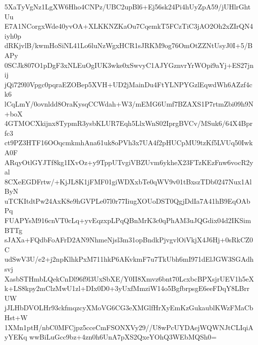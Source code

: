5XaTyVgNz1LgXW6Hho4CNPz/UBC2upBl6+Ej56sk24Pi4hUyZpA59/jUHlrGhtUu
E7A1NCorgxWde40yvOA+XLKKNZKaOu7CqemkT5FCzTiC3jAO2Oh2xZIrQN4iyh0p
dRKjvlB/kwmHoSiNL41Lo6luNzWgxHCR1sJRKM9og76OmOtZZNtUsyJ0I+5/BAPy
0SCJk807O1pDgF3xNLEuOgIUK3wke0xSwvyC1AJYGznvrYrWOpi9aYj+ES27jnij
jQi729l0Vpgc0pqraEZOBep5XVH+UD2jMainDu4FtYLNPYGzlEqwdWh6AZzf4ck6
lCqLmY/0ovnldd8OraKysqCCWdah+W3/mEMG6Umf7BZAXS1P7rtmZbi09h9N+boX
4GTMOCXkijnx8TypmR3ysbKLUR7Eqh5LlxWnS02IprgBVCv/MSuk6/64X4Bprfc3
ct9PZ3HTF16OOqcmkmhAna61uk8oPVh3x7UA4f2pHUCpMU9tzKf5LVUq50IwkA0F
ARqyOtlGYJTf8kg1IXvOz+y9TppUTvgiVBZUvm6ykheX23FTzKEzFnw6vocR2yal
8CXeEGDFrtw/+KjJL8K1jFMF01giWDXxbTe0qWV9v01tBxszTDb0247Nux1AlByN
uTCKItdtPw24AxK8e9hGVPLe07l0r77IiugXOUoDST0QgjDdIa7A41hB9EqOAbPq
FUAPYsM916cnVT0cLq+yvEqzxpLPqQBnMrK3c0qPhAM3uJQGdix04d2IKSimBTTg
sJAXa+FQdbFoAFrD2AN9NhmeNjsl3m31opBndkPjvgvlOiVkjX4J6Hj+0sRkCZ0C
udSwV3U/e2+j2npKlhkPxM711hkP6AKvkmF7u7TkUbh6mI971dElJGW3SGAdhsvj
XasbSTHmbLQekCnDl96f9l3UxSbXE/Y0II8Xmvz6bnt70LcxbcBPXsjrUEV1h5eX
k+LS8kpy2mClzMwU1zl+DIx0D0+3yUxfMmziW14o5BgfbrpsgE6eeFDqY8LBrrUW
jJLHbDVOLHr93ckfmqzcyXMoVG6CG3eXMGlfHrXyEmKzGukaublKWzFMaCbHst+W
1XMn1ptH/nbC0MFCjpz5cceCmFSONXVy29//U8wPcUYDAejWQWNJtCLIqiAyYEKq
wwBiLuGcc9bz+4zn0h6UnA7pXS2QxeYOhQ3WEbMQSh0=
